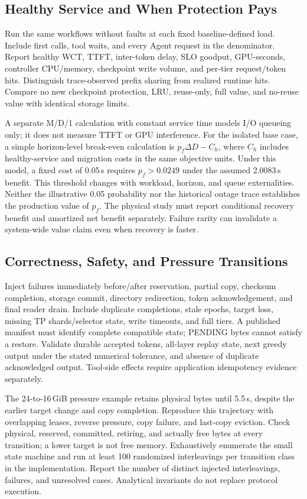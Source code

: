 \documentclass[sigplan,10pt,anonymous,nonacm]{acmart}
\begin{document}
\FloatBarrier
\subsection{Healthy Service and When Protection Pays}

Run the same workflows without faults at each fixed baseline-defined
load. Include first calls, tool waits, and every Agent request in the
denominator. Report healthy WCT, TTFT, inter-token delay, SLO goodput,
GPU-seconds, controller CPU/memory, checkpoint write volume, and per-tier
request/token hits. Distinguish trace-observed prefix sharing from
realized runtime hits. Compare no new checkpoint protection, LRU,
reuse-only, full value, and no-reuse value with identical storage limits.

A separate M/D/1 calculation with constant service time models I/O queueing only; it does not measure TTFT or GPU interference. For the isolated base case, a simple horizon-level
break-even calculation is $p_f\Delta D-C_h$, where $C_h$ includes
healthy-service and migration costs in the same objective units.
Under this model, a fixed cost of 0.05\,s
requires $p_f>0.0249$ under the assumed 2.0083\,s benefit. This threshold
changes with workload, horizon, and queue externalities. Neither the
illustrative 0.05 probability nor the historical outage trace establishes
the production value of $p_f$. The physical study must report conditional
recovery benefit and amortized net benefit separately. Failure rarity
can invalidate a system-wide value claim even when recovery is faster.

\FloatBarrier
\subsection{Correctness, Safety, and Pressure Transitions}

Inject failures immediately before/after reservation, partial copy,
checksum completion, storage commit, directory redirection, token
acknowledgement, and final reader drain. Include duplicate completions,
stale epochs, target loss, missing TP shards/selector state, write timeouts,
and full tiers. A published manifest must identify complete compatible
state; PENDING bytes cannot satisfy a restore. Validate durable accepted
tokens, all-layer replay state, next greedy output under the stated
numerical tolerance, and absence of duplicate acknowledged output.
Tool-side effects require application idempotency evidence separately.

The 24-to-16\,GiB pressure example retains physical bytes until 5.5\,s,
despite the earlier target change and copy completion. Reproduce this
trajectory with overlapping leases, reverse pressure, copy failure,
and last-copy eviction. Check physical, reserved, committed, retiring,
and actually free bytes at every transition; a lower target is not free
memory. Exhaustively enumerate the small state machine and run at least
100 randomized interleavings per transition class in the implementation.
Report the number of distinct injected interleavings, failures, and
unresolved cases. Analytical invariants do not replace protocol execution.
\end{document}
